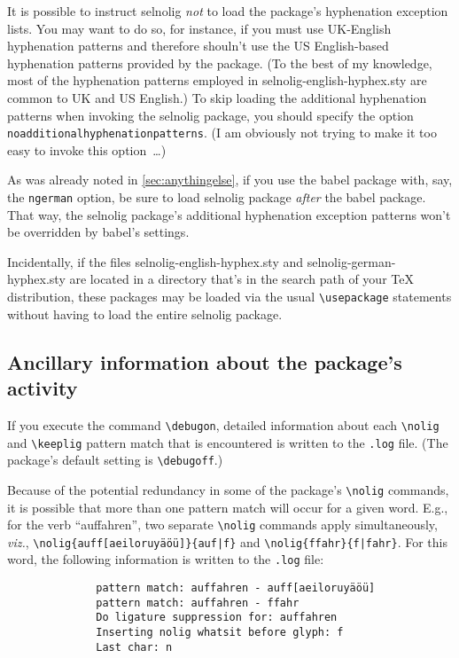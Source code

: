 \documentclass[11pt]{article}
\newcommand{\pkg}[1]{\textsf{#1}}
\newcommand{\opt}[1]{\texttt{#1}}
\newcommand{\cmmd}[1]{\texttt{\textbackslash #1}}
\begin{document}
It is possible to instruct \pkg{selnolig} \emph{not} to load the package's hyphenation exception lists. You may want to do so, for instance, if you must use UK-English hyphenation patterns and therefore shouln't use the US English-based hyphenation patterns provided by the package. (To the best of my knowledge, most of the hyphenation patterns employed in \pkg{selnolig-english-hyphex.sty} are common to UK and US English.) To skip loading the additional hyphenation patterns when invoking the \pkg{selnolig} package, you should specify the option \opt{noadditional\-hyphen\-a\-tion\-patterns}. (I am obviously not trying to make it too easy to invoke this option~\dots)

As was already noted in \cref{sec:anythingelse}, if you use the \pkg{babel} package with, say, the \opt{ngerman} option, be sure to load \pkg{selnolig} package \emph{after} the \pkg{babel} package. That way, the \pkg{selnolig} package's additional hyphenation exception patterns won't be overridden by \pkg{babel}'s settings.

Incidentally, if the files \pkg{selnolig-english-hyphex.sty} and \pkg{selnolig-german-hyphex.sty} are located in a directory that's in the search path of your TeX distribution, these packages may be loaded via the usual \cmmd{usepackage} statements without having to load the entire \pkg{selnolig} package.



\subsection{Ancillary information about the package's activity} \label{sec:debugon}

If you execute the command \cmmd{debugon}, detailed information about each \cmmd{nolig} and \cmmd{keeplig} pattern match that is encountered is written to the \opt{.log} file. (The package's default setting is \cmmd{debugoff}.)

Because of the potential redundancy in some of the package's \cmmd{nolig} commands, it is possible that more than one pattern match will occur for a given word. E.g., for the verb \enquote{auffahren}, two separate \cmmd{nolig} commands apply simultaneously, \emph{viz.}, \Verb+\nolig{auff[aeiloruyäöü]}{auf|f}+ and \Verb+\nolig{ffahr}{f|fahr}+. For this word, the following information is written to the \opt{.log} file:
\begin{Verbatim}
              pattern match: auffahren - auff[aeiloruyäöü]
              pattern match: auffahren - ffahr
              Do ligature suppression for: auffahren
              Inserting nolig whatsit before glyph: f
              Last char: n
\end{Verbatim}
\end{document}
